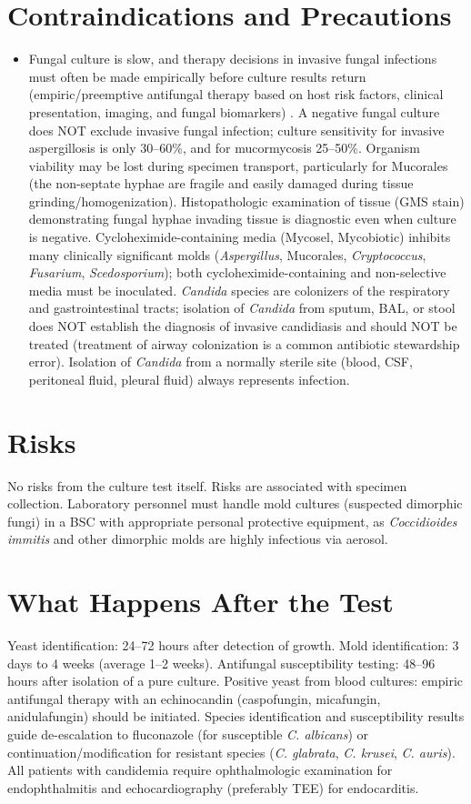 \section*{Contraindications and Precautions}
\begin{itemize}
  \item Fungal culture is slow, and therapy decisions in invasive fungal infections must often be made empirically before culture results return (empiric/preemptive antifungal therapy based on host risk factors, clinical presentation, imaging, and fungal biomarkers) \cite{walsh2008treatment}. A negative fungal culture does NOT exclude invasive fungal infection; culture sensitivity for invasive aspergillosis is only 30--60\%, and for mucormycosis 25--50\%. Organism viability may be lost during specimen transport, particularly for Mucorales (the non-septate hyphae are fragile and easily damaged during tissue grinding/homogenization). Histopathologic examination of tissue (GMS stain) demonstrating fungal hyphae invading tissue is diagnostic even when culture is negative. Cycloheximide-containing media (Mycosel, Mycobiotic) inhibits many clinically significant molds (\textit{Aspergillus}, Mucorales, \textit{Cryptococcus}, \textit{Fusarium}, \textit{Scedosporium}); both cycloheximide-containing and non-selective media must be inoculated. \textit{Candida} species are colonizers of the respiratory and gastrointestinal tracts; isolation of \textit{Candida} from sputum, BAL, or stool does NOT establish the diagnosis of invasive candidiasis and should NOT be treated (treatment of airway colonization is a common antibiotic stewardship error). Isolation of \textit{Candida} from a normally sterile site (blood, CSF, peritoneal fluid, pleural fluid) always represents infection.
\end{itemize}
\section*{Risks}
No risks from the culture test itself. Risks are associated with specimen collection. Laboratory personnel must handle mold cultures (suspected dimorphic fungi) in a BSC with appropriate personal protective equipment, as \textit{Coccidioides immitis} and other dimorphic molds are highly infectious via aerosol.

\section*{What Happens After the Test}
Yeast identification: 24--72 hours after detection of growth. Mold identification: 3 days to 4 weeks (average 1--2 weeks). Antifungal susceptibility testing: 48--96 hours after isolation of a pure culture. Positive yeast from blood cultures: empiric antifungal therapy with an echinocandin (caspofungin, micafungin, anidulafungin) should be initiated. Species identification and susceptibility results guide de-escalation to fluconazole (for susceptible \textit{C. albicans}) or continuation/modification for resistant species (\textit{C. glabrata}, \textit{C. krusei}, \textit{C. auris}). All patients with candidemia require ophthalmologic examination for endophthalmitis and echocardiography (preferably TEE) for endocarditis.


